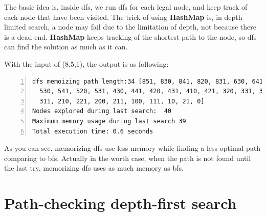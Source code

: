 \documentclass{article}
\begin{document}
The basic idea is, inside dfs, we run dfs for each legal node, and keep track of each node that have been visited. The trick of using \textbf{HashMap} is, in depth limited search, a node may fail due to the limitation of depth, not because there is a dead end. \textbf{HashMap} keeps tracking of the shortest path to the node, so dfs can find the solution as much as it can.

With the input of (8,5,1), the output is as following:

\begin{lstlisting}[numbers=left]
dfs memoizing path length:34 [851, 830, 841, 820, 831, 630, 641, 540, 551,
  530, 541, 520, 531, 430, 441, 420, 431, 410, 421, 320, 331, 310, 321, 300,
  311, 210, 221, 200, 211, 100, 111, 10, 21, 0]
Nodes explored during last search:  40
Maximum memory usage during last search 39
Total execution time: 0.6 seconds
\end{lstlisting}

As you can see, memorizing dfs use less memory while finding a less optimal path comparing to bfs. Actually in the worth case, when the path is not found until the last try, memorizing dfs uses as much memory as bfs.















\section{Path-checking depth-first search}
\end{document}
